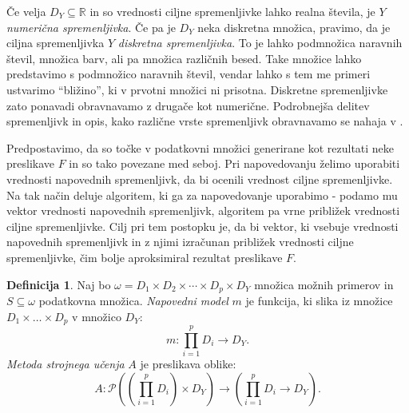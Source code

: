 \documentclass[12pt,a4paper,twoside]{article}
\theoremstyle{definition} %
\newtheorem{definicija}{Definicija}[section]
\theoremstyle{plain} %
\numberwithin{equation}{section}  %
\newcommand{\R}{\mathbb R}
\begin{document}
Če velja $D_Y \subseteq \R$ in so vrednosti ciljne spremenljivke lahko realna števila, je $Y$ \emph{numerična spremenljivka}.
Če pa je $D_Y$ neka diskretna množica, pravimo, da je ciljna spremenljivka $Y$ \emph{diskretna spremenljivka}.
To je lahko podmnožica naravnih števil, množica barv, ali pa množica različnih besed. 
Take množice lahko predstavimo s podmnožico naravnih števil, vendar lahko s tem me primeri ustvarimo ``bližino'', ki v prvotni množici ni prisotna. 
Diskretne spremenljivke zato ponavadi obravnavamo z drugače kot numerične.
Podrobnejša delitev spremenljivk in opis, kako različne vrste spremenljivk obravnavamo se nahaja v \cite[pogl. 10]{flach2012machine}.


Predpostavimo, da so točke v podatkovni množici generirane kot rezultati neke preslikave $F$ in so tako povezane med seboj.
Pri napovedovanju želimo uporabiti vrednosti napovednih spremenljivk, da bi ocenili vrednost ciljne spremenljivke.
Na tak način deluje algoritem, ki ga za napovedovanje uporabimo - podamo mu vektor vrednosti napovednih spremenljivk, algoritem pa vrne približek vrednosti ciljne spremenljivke.
Cilj pri tem postopku je, da bi vektor, ki vsebuje vrednosti napovednih spremenljivk in z njimi izračunan približek vrednosti ciljne spremenljivke, čim bolje aproksimiral rezultat preslikave $F$.

\begin{definicija}
\label{def:model_metoda}
	Naj bo $\omega = D_1 \times D_2 \times \cdots \times D_p \times D_Y$ množica možnih primerov in $S \subseteq \omega$ podatkovna množica.
	\emph{Napovedni model} $m$ je funkcija, ki slika iz množice $D_1 \times \ldots \times D_p$ v množico $D_Y$:
	\[
	m: \prod_{i=1}^p D_i \rightarrow D_Y.
	\]
	\emph{Metoda strojnega učenja} $A$ je preslikava oblike:
	\[
	A: \mathcal{P} \left( \left(\prod_{i=1}^p D_i \right) \times D_Y \right) \rightarrow \left(\prod_{i=1}^p D_i \rightarrow D_Y \right).
	\]
\end{definicija}
\end{document}
